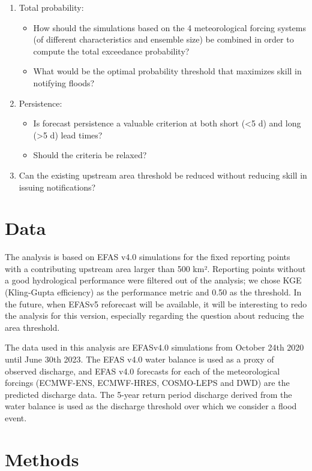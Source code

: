 \documentclass[preprint,12pt]{elsarticle}
\begin{document}
\begin{enumerate}
    \item Total probability:
    \begin{itemize}
        \item How should the simulations based on the 4 meteorological forcing systems (of different characteristics and ensemble size) be combined in order to compute the total exceedance probability?
        \item What would be the optimal probability threshold that maximizes skill in notifying floods?
    \end{itemize}
    \item Persistence:
    \begin{itemize}
        \item Is forecast persistence a valuable criterion at both short (\textless 5 d) and long (\textgreater 5 d) lead times?
        \item Should the criteria be relaxed?
    \end{itemize}
    \item Can the existing upstream area threshold be reduced without reducing skill in issuing notifications?
\end{enumerate}

\section{Data}

The analysis is based on EFAS v4.0 simulations for the fixed reporting points with a contributing upstream area larger than 500 km².  Reporting points without a good hydrological performance were filtered out of the analysis; we chose KGE (Kling-Gupta efficiency) as the performance metric and 0.50 as the threshold. In the future, when EFASv5 reforecast will be available, it will be interesting to redo the analysis for this version, especially regarding the question about reducing the area threshold.

The data used in this analysis are EFASv4.0 simulations from October 24th 2020 until June 30th 2023. The EFAS v4.0 water balance is used as a proxy of observed discharge, and EFAS v4.0 forecasts for each of the meteorological forcings (ECMWF-ENS, ECMWF-HRES, COSMO-LEPS and DWD) are the predicted discharge data. The 5-year return period discharge derived from the water balance is used as the discharge threshold over which we consider a flood event.

\section{Methods}
\end{document}
